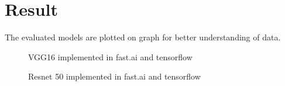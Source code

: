 \documentclass[11pt]{article}
\begin{document}
	\section{Result}%
	\label{sec:result}

	The evaluated models are plotted on graph for better understanding of data.

	\begin{figure}[H]
		\centering
		\hspace{0.5cm}
		\caption{VGG16 implemented in fast.ai and tensorflow}
		\label{VGG16 in fast.ai and tensorflow}
	\end{figure}


	\begin{figure}[H]
		\centering
		\hspace{0.5cm}
		\caption{Resnet 50 implemented in fast.ai and tensorflow}
		\label{ResNet 50 in fast.ai and tensorflow}
	\end{figure}
\end{document}

